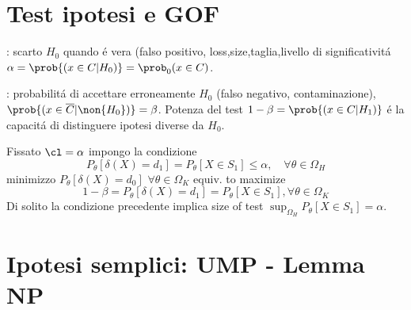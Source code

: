 \section{Test ipotesi e GOF}

: scarto $H_0$ quando \'e vera (falso positivo, loss,size,taglia,livello di significativit\'a $\alpha=\prob{(x\in C|H_0)}=\prob_0{(x\in C)}$.

: probabilit\'a di accettare erroneamente $H_0$ (falso negativo, contaminazione), $\prob{(x\in\overline{C}|\non{H_0})}=\beta$. Potenza del test $1-\beta=\prob{(x\in C|H_1)}$ \'e la capacit\'a di distinguere ipotesi diverse da $H_0$.

Fissato $\cl=\alpha$ impongo la condizione \[P_{\theta}[\delta(X)=d_1]=P_{\theta}[X\in S_1]\leq\alpha,\quad \forall\theta\in\Omega_H\]
minimizzo $P_{\theta}[\delta(X)=d_0]$ $\forall\theta\in\Omega_K$ equiv. to maximize
\[1-\beta=P_{\theta}[\delta(X)=d_1]=P_{\theta}[X\in S_1], \forall\theta\in\Omega_K\]
Di solito la condizione precedente implica size of test $\sup_{\Omega_H}{P_{\theta}[X\in S_1]}=\alpha$.

\section{Ipotesi semplici: UMP - Lemma NP}


